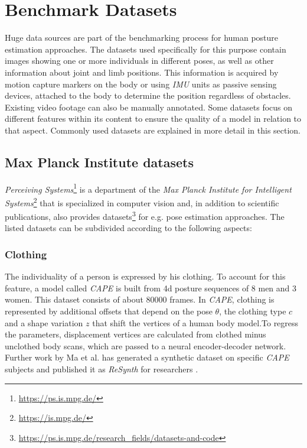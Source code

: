 \section{Benchmark Datasets}
\label{sec:benchmarks}
Huge data sources are part of the benchmarking process for human posture estimation approaches. The datasets used specifically for this purpose contain images showing one or more individuals in different poses, as well as other information about joint and limb positions. This information is acquired by motion capture markers on the body or using \emph{IMU} units as passive sensing devices, attached to the body to determine the position regardless of obstacles. Existing video footage can also be manually annotated. Some datasets focus on different features within its content to ensure the quality of a model in relation to that aspect. Commonly used datasets are explained in more detail in this section.

\subsection{Max Planck Institute datasets}
\emph{Perceiving Systems}\footnote{\url{https://ps.is.mpg.de/}} is a department of the \emph{Max Planck Institute for Intelligent Systems}\footnote{\url{https://is.mpg.de/}} that is specialized in computer vision and, in addition to scientific publications, also provides datasets\footnote{\url{https://ps.is.mpg.de/research_fields/datasets-and-code}} for e.g. pose estimation approaches. The listed datasets can be subdivided according to the following aspects:

\subsubsection{Clothing}
The individuality of a person is expressed by his clothing. To account for this feature, a model called \emph{CAPE} is built from 4d posture sequences of 8 men and 3 women. This dataset consists of about 80000 frames. In \emph{CAPE}, clothing is represented by additional offsets that depend on the pose $\theta$, the clothing type $c$ and a shape variation $z$ that shift the vertices of a human body model.To regress the parameters, displacement vertices are calculated from clothed minus unclothed body scans, which are passed to a neural encoder-decoder network.\cite{cape}
Further work by Ma et al. has generated a synthetic dataset on specific \emph{CAPE} subjects and published it as \emph{ReSynth} for researchers \cite{resynth}.


